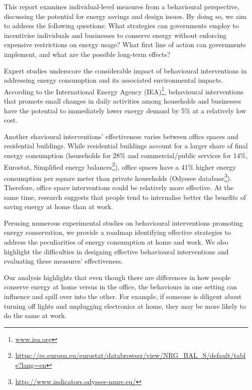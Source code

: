 \documentclass[
  12pt,
  captions=heading]{scrreport}
\DeclareRobustCommand{\href}[2]{#2\footnote{\url{#1}}}
\begin{document}
This report examines individual-level measures from a behavioural
perspective, discussing the potential for energy savings and design
issues. By doing so, we aim to address the following questions: What
strategies can governments employ to incentivise individuals and
businesses to conserve energy without enforcing expensive restrictions
on energy usage? What first line of action can governments implement,
and what are the possible long-term effects?

Expert studies underscore the considerable impact of behavioural
interventions in addressing energy consumption and its associated
environmental impacts. According to the \href{www.iea.org}{International
Energy Agency (IEA)}, behavioural interventions that promote small
changes in daily activities among households and businesses have the
potential to immediately lower energy demand by 5\% at a relatively low
cost.

Another ehavioural interventions' effectiveness varies between office
spaces and residential buildings. While residential buildings account
for a larger share of final energy consumption (households for 28\% and
commercial/public services for 14\%,
\href{https://ec.europa.eu/eurostat/databrowser/view/NRG_BAL_S/default/table?lang=en}{Eurostat,
Simplified energy balances}), office spaces have a 41\% higher energy
consumption per square meter than private households
(\href{http://www.indicators.odyssee-mure.eu/}{Odyssee database}).
Therefore, office space interventions could be relatively more
effective. At the same time, research suggests that people tend to
internalise better the benefits of saving energy at home than at work.


Perusing numerous experimental studies on behavioural interventions
promoting energy conservation, we provide a roadmap identifying
effective strategies to address the peculiarities of energy consumption
at home and work. We also highlight the difficulties in designing
effective behavioural interventions and evaluating these measures'
effectiveness.

Our analysis highlights that even though there are differences in how
people conserve energy at home versus in the office, the behaviours in
one setting can influence and spill over into the other. For example, if
someone is diligent about turning off lights and unplugging electronics
at home, they may be more likely to do the same at work.
\end{document}
